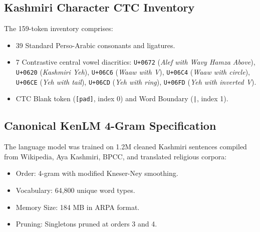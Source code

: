 \subsection{Kashmiri Character CTC Inventory}
The 159-token inventory comprises:
\begin{itemize}
    \item 39 Standard Perso-Arabic consonants and ligatures.
    \item 7 Contrastive central vowel diacritics: \texttt{U+0672} (\textit{Alef with Wavy Hamza Above}), \texttt{U+0620} (\textit{Kashmiri Yeh}), \texttt{U+06C6} (\textit{Waaw with V}), \texttt{U+06C4} (\textit{Waaw with circle}), \texttt{U+06CE} (\textit{Yeh with tail}), \texttt{U+06CD} (\textit{Yeh with ring}), \texttt{U+06FD} (\textit{Yeh with inverted V}).
    \item CTC Blank token (\texttt{[pad]}, index 0) and Word Boundary (\texttt{|}, index 1).
\end{itemize}

\subsection{Canonical KenLM 4-Gram Specification}
The language model was trained on 1.2M cleaned Kashmiri sentences compiled from Wikipedia, Aya Kashmiri, BPCC, and translated religious corpora:
\begin{itemize}
    \item Order: 4-gram with modified Kneser-Ney smoothing.
    \item Vocabulary: 64,800 unique word types.
    \item Memory Size: 184 MB in ARPA format.
    \item Pruning: Singletons pruned at orders 3 and 4.
\end{itemize}
